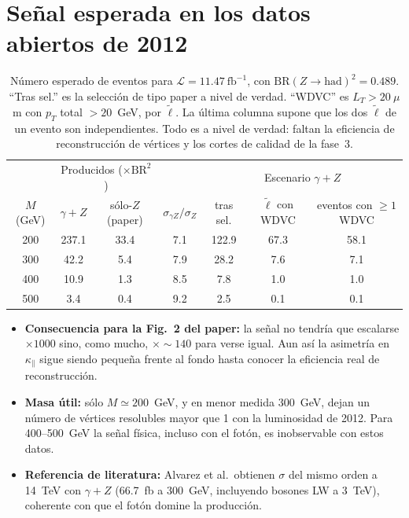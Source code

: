 \documentclass[11pt,a4paper]{article}
\newcommand{\lt}{\tilde{\ell}}
\newcommand{\kpar}{\kappa_{\parallel}}
\begin{document}
\section{Señal esperada en los datos abiertos de 2012}
\begin{table}[H]
\centering\small
\begin{tabular}{c|cc|c|ccc}
\toprule
 & \multicolumn{2}{c|}{Producidos ($\times\mathrm{BR}^2$)} & & \multicolumn{3}{c}{Escenario $\gamma+Z$}\\
$M$ (GeV) & $\gamma+Z$ & sólo-$Z$ (paper) & $\sigma_{\gamma Z}/\sigma_Z$ & tras sel. & $\lt$ con WDVC & eventos con $\ge1$ WDVC\\
\midrule
200 & 237.1 & 33.4 & 7.1 & 122.9 & 67.3 & 58.1\\
300 & 42.2 & 5.4 & 7.9 & 28.2 & 7.6 & 7.1\\
400 & 10.9 & 1.3 & 8.5 & 7.8 & 1.0 & 1.0\\
500 & 3.4 & 0.4 & 9.2 & 2.5 & 0.1 & 0.1\\
\bottomrule
\end{tabular}
\caption{Número esperado de eventos para $\mathcal{L}=11.47~\mathrm{fb}^{-1}$, con $\mathrm{BR}(Z\to\mathrm{had})^2=0.489$. ``Tras sel.'' es la selección de tipo paper a nivel de verdad. ``WDVC'' es $L_T>20~\mu$m con $p_T$ total $>20$~GeV, por $\lt$. La última columna supone que los dos $\lt$ de un evento son independientes. Todo es a nivel de verdad: faltan la eficiencia de reconstrucción de vértices y los cortes de calidad de la fase~3.}
\end{table}
\begin{itemize}
\item \textbf{Consecuencia para la Fig.~2 del paper:} la señal no tendría que escalarse $\times1000$ sino, como mucho, $\times\sim140$ para verse igual. Aun así la asimetría en $\kpar$ sigue siendo pequeña frente al fondo hasta conocer la eficiencia real de reconstrucción.
\item \textbf{Masa útil:} sólo $M\simeq200$~GeV, y en menor medida 300~GeV, dejan un número de vértices resolubles mayor que 1 con la luminosidad de 2012. Para 400--500~GeV la señal física, incluso con el fotón, es inobservable con estos datos.
\item \textbf{Referencia de literatura:} Alvarez et al.\ obtienen $\sigma$ del mismo orden a 14~TeV con $\gamma+Z$ (66.7~fb a 300~GeV, incluyendo bosones LW a 3~TeV), coherente con que el fotón domine la producción.
\end{itemize}
\end{document}
